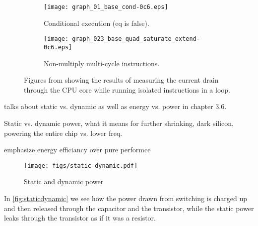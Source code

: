 \begin{figure}
\begin{subfigure}[b]{0.48\textwidth}
\texttt{[image: graph\_01\_base\_cond-0c6.eps]}
\caption{Conditional execution (eq is false).}
\end{subfigure}
\begin{subfigure}[b]{0.52\textwidth}
\texttt{[image: graph\_023\_base\_quad\_saturate\_extend-0c6.eps]}
\caption{Non-multiply multi-cycle instructions.}
\end{subfigure}
\caption{Figures from \cite{rundehvatum2013exploring} showing the results of measuring the
current drain through the CPU core while running isolated instructions in a loop.}
\end{figure}

\cite{wolf} talks about static vs. dynamic as well as energy vs. power in chapter 3.6.

Static vs. dynamic power, what it means for further shrinking, dark silicon, powering
the entire chip vs. lower freq.

emphasize energy efficiancy over pure performce 

\begin{figure}
    \centering
    \texttt{[image: figs/static-dynamic.pdf]}
    \caption{Static and dynamic power}
    \label{fig:staticdynamic}
\end{figure}

In \autoref{fig:staticdynamic} we see how the power drawn from switching is charged up and then released
through the capacitor and the transistor, while the static power leaks through the transistor as if
it was a resistor.

